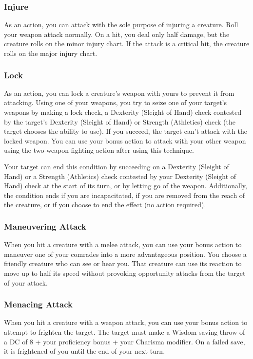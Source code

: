 \subsubsection{Injure} \label{tec::injure}
As an action, you can attack with the sole purpose of injuring a creature.
Roll your weapon attack normally.
On a hit, you deal only half damage, but the creature rolls on the minor injury chart.
If the attack is a critical hit, the creature rolls on the major injury chart.

\subsubsection{Lock} \label{tec::lock}
As an action, you can lock a creature's weapon with yours to prevent it from attacking.
Using one of your weapons, you try to seize one of your target's weapons by making a lock check, a Dexterity (Sleight of Hand) check contested by the target's Dexterity (Sleight of Hand) or Strength (Athletics) check (the target chooses the ability to use).
If you succeed, the target can't attack with the locked weapon.
You can use your bonus action to attack with your other weapon using the two-weapon fighting action after using this technique.

Your target can end this condition by succeeding on a Dexterity (Sleight of Hand) or a Strength (Athletics) check contested by your Dexterity (Sleight of Hand) check at the start of its turn, or by letting go of the weapon.
Additionally, the condition ends if you are incapacitated, if you are removed from the reach of the creature, or if you choose to end the effect (no action required).

\subsubsection{Maneuvering Attack} \label{tec::maneuveringattack}
When you hit a creature with a melee attack, you can use your bonus action to maneuver one of your comrades into a more advantageous position.
You choose a friendly creature who can see or hear you.
That creature can use its reaction to move up to half its speed without provoking opportunity attacks from the target of your attack.

\subsubsection{Menacing Attack} \label{tec::menacingattack}
When you hit a creature with a weapon attack, you can use your bonus action to attempt to frighten the target.
The target must make a Wisdom saving throw of a DC of 8 + your proficiency bonus + your Charisma modifier.
On a failed save, it is frightened of you until the end of your next turn.

